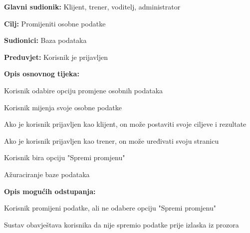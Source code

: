 					
					\noindent {}
					\begin{packed_item}
	
						\item \textbf{Glavni sudionik: }Klijent, trener, voditelj, administrator
						\item  \textbf{Cilj:} Promijeniti osobne podatke
						\item  \textbf{Sudionici:} Baza podataka
						\item  \textbf{Preduvjet:} Korisnik je prijavljen
						\item  \textbf{Opis osnovnog tijeka:}
						
						\item[] \begin{packed_enum}
	
							\item Korisnik odabire opciju promjene osobnih podataka
							\item Korisnik mijenja svoje osobne podatke
							\begin{packed_item}
	
							\item Ako je korisnik prijavljen kao klijent, on može postaviti svoje ciljeve i rezultate
							\item Ako je korisnik prijavljen kao trener, on može uređivati svoju stranicu
						\end{packed_item}
							\item Korisnik bira opciju "Spremi promjenu"
							\item Ažuraciranje baze podataka
						\end{packed_enum}
					
						\item  \textbf{Opis mogućih odstupanja:}
						
						\item[] \begin{packed_item}
	
							\item[-]
						Korisnik promijeni podatke, ali ne odabere opciju "Spremi promjenu"
							\item[] \begin{packed_enum}
								
								\item Sustav obavještava korisnika da nije spremio podatke prije izlaska iz prozora
							\end{packed_enum}
						\end{packed_item}
					\end{packed_item}
					

